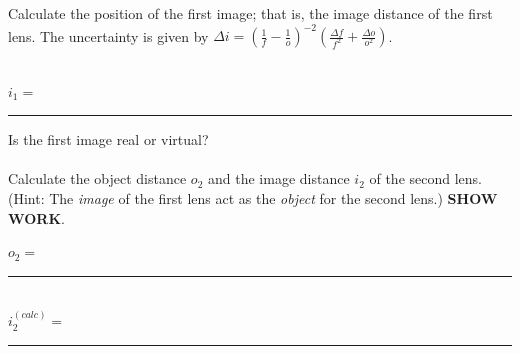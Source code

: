 \clearpage
\noindent Calculate the position of the first image; that is, the image distance of the first lens.
The uncertainty is given by
$ \Delta i = \left( \frac{1}{f}-\frac{1}{o} \right)^{-2} \left( \frac{\Delta f}{f^2} + \frac{\Delta o}{o^2} \right)$.\\
\vspace*{3cm} \\

\begin{center}
$i_1=$~\rule{3cm}{.1mm}
\end{center}
\noindent Is the first image real or virtual?\\
\vspace*{.5cm} \\

\noindent Calculate the object distance $o_2$ and the image distance $i_2$ of the second lens.
(Hint: The {\it image} of the first lens act as the {\it object} for the second lens.)
{\bf SHOW WORK}.
\vspace*{1.5cm} \\
\begin{center}
$o_2=$~\rule{3cm}{.1mm}
\vspace*{3cm} \\
$i_2^{(calc)}=$~\rule{3cm}{.1mm}
\end{center}


\vspace*{.5cm}

